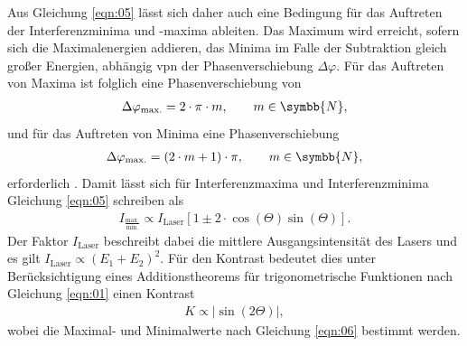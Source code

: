 \noindent Aus Gleichung \ref{eqn:05} lässt sich daher auch eine Bedingung für
das Auftreten der Interferenzminima und -maxima ableiten. Das Maximum wird
erreicht, sofern sich die Maximalenergien addieren, das Minima im Falle der
Subtraktion gleich großer Energien, abhängig vpn der Phasenverschiebung $\Delta
\varphi$. Für das Auftreten von Maxima ist folglich eine Phasenverschiebung von
\begin{align*}
  \Delta \varphi_\text{max.} = 2 \cdot \pi \cdot m, \qquad m \in \symbb{N},
\end{align*}
\noindent und für das Auftreten von Minima eine Phasenverschiebung
\begin{align*}
  \Delta \varphi_\text{max.} = (2 \cdot m + 1) \cdot \pi, \qquad m \in \symbb{N},
\end{align*}
\noindent erforderlich \cite{hecht}. Damit lässt sich für Interferenzmaxima und
Interferenzminima Gleichung \ref{eqn:05} schreiben als
\begin{align}
  I_{\frac{\text{max.}}{\text{min.}}} \propto I_\text{Laser} \left[1 \pm 2 \cdot \cos(\Theta) \sin(\Theta) \right].
  \label{eqn:06}
\end{align}
\noindent Der Faktor $I_\text{Laser}$ beschreibt dabei die mittlere
Ausgangsintensität des Lasers und es gilt $I_\text{Laser} \propto (E_1 + E_2)^2$.
Für den Kontrast bedeutet dies unter Berücksichtigung eines Additionstheorems
für trigonometrische Funktionen nach Gleichung \ref{eqn:01} einen Kontrast
\begin{align}
  K \propto | \sin(2 \Theta) |,
  \label{eqn:01b}
\end{align}
\noindent wobei die Maximal- und Minimalwerte nach Gleichung \ref{eqn:06}
bestimmt werden.
